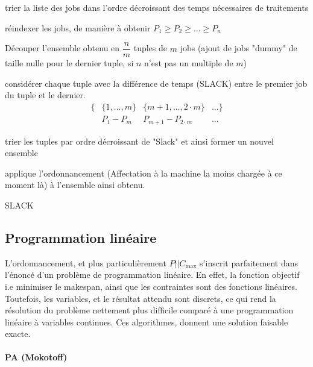 \documentclass[a4paper,12pt]{report}
\theoremstyle{plain}				%
\theoremstyle{definition}				%
\newcommand\problemGrahamP{$P||C_{\max}$\xspace}
\begin{document}
\bigskip
\begin{algorithm}[H]
\DontPrintSemicolon

trier la liste des jobs dans l'ordre décroissant des temps nécessaires de traitements

\BlankLine %
réindexer les jobs, de manière à obtenir $P_1 \geq P_2 \geq ... \geq P_n$

\BlankLine %
Découper l'ensemble obtenu en $\dfrac{n}{m}$ tuples de $m$ jobs (ajout
de jobs "dummy" de taille nulle pour le dernier tuple, si $n$ n'est
pas un multiple de $m$)

\BlankLine %
considérer chaque tuple avec la différence de temps (SLACK) entre le
premier job du tuple et le dernier.
\begin{align*}
\{ &\{1, ..., m\} &\{m+1,..., 2 \cdot m\} &... \} \\
   &P_1 - P_m     &P_{m+1}-P_{2 \cdot m}  &...
\end{align*}


\BlankLine %
trier les tuples par ordre décroissant de "Slack" et ainsi former un nouvel ensemble

\BlankLine %
applique l'ordonnancement (Affectation à la machine la moins chargée à ce moment là) à l'ensemble ainsi obtenu.

\caption{SLACK\label{SLACK}}
\end{algorithm}

\subsection{Programmation linéaire}

L'ordonnancement, et plus particulièrement \problemGrahamP s'inscrit
parfaitement dans l'énoncé d'un problème de programmation linéaire.
En effet, la fonction objectif i.e minimiser le makespan, ainsi que
les contraintes sont des fonctions linéaires.
Toutefois, les variables, et le résultat attendu sont discrets, ce qui
rend la résolution du problème nettement plus difficile comparé à une
programmation linéaire à variables continues.
Ces algorithmes, donnent une solution faisable exacte.

\paragraph{PA (Mokotoff)}
\end{document}
